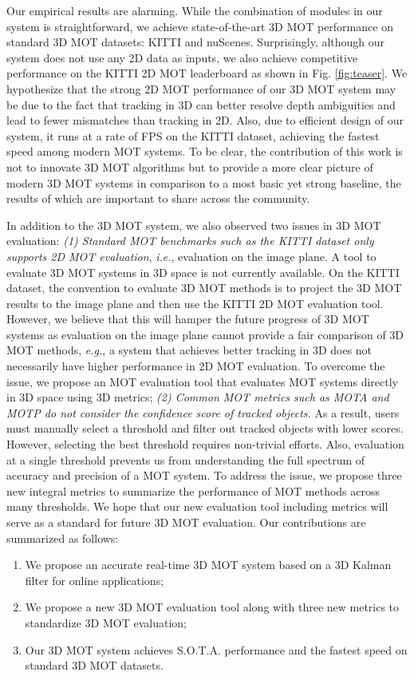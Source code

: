 \documentclass[letterpaper, 10 pt, conference]{ieeeconf}
\begin{document}
Our empirical results are alarming. While the combination of modules in our system is straightforward, we achieve state-of-the-art 3D MOT performance on standard 3D MOT datasets: KITTI and nuScenes. Surprisingly, although our system does not use any 2D data as inputs, we also achieve competitive performance on the KITTI 2D MOT leaderboard as shown in Fig. \ref{fig:teaser}. We hypothesize that the strong 2D MOT performance of our 3D MOT system may be due to the fact that tracking in 3D can better resolve depth ambiguities and lead to fewer mismatches than tracking in 2D. Also, due to efficient design of our system, it runs at a rate of  FPS on the KITTI dataset, achieving the fastest speed among modern MOT systems. To be clear, the contribution of this work is not to innovate 3D MOT algorithms but to provide a more clear picture of modern 3D MOT systems in comparison to a most basic yet strong baseline, the results of which are important to share across the community.

In addition to the 3D MOT system, we also observed two issues in 3D MOT evaluation: \textit{(1) Standard MOT benchmarks such as the KITTI dataset only supports 2D MOT evaluation}, \emph{i.e.}, evaluation on the image plane. A tool to evaluate 3D MOT systems in 3D space is not currently available. On the KITTI dataset, the convention to evaluate 3D MOT methods is to project the 3D MOT results to the image plane and then use the KITTI 2D MOT evaluation tool. However, we believe that this will hamper the future progress of 3D MOT systems as evaluation on the image plane cannot provide a fair comparison of 3D MOT methods, \emph{e.g.}, a system that achieves better tracking in 3D does not necessarily have higher performance in 2D MOT evaluation. To overcome the issue, we propose an MOT evaluation tool that evaluates MOT systems directly in 3D space using 3D metrics; \textit{(2) Common MOT metrics such as MOTA and MOTP do not consider the confidence score of tracked objects.} As a result, users must manually select a threshold and filter out tracked objects with lower scores. However, selecting the best threshold requires non-trivial efforts. Also, evaluation at a single threshold prevents us from understanding the full spectrum of accuracy and precision of a MOT system. To address the issue, we propose three new integral metrics to summarize the performance of MOT methods across many thresholds. We hope that our new evaluation tool including metrics will serve as a standard for future 3D MOT evaluation. Our contributions are summarized as follows: 
\begin{enumerate}
    \item We propose an accurate real-time 3D MOT system based on a 3D Kalman filter for online applications; 
    \item We propose a new 3D MOT evaluation tool along with three new metrics to standardize 3D MOT evaluation;
    \item Our 3D MOT system achieves S.O.T.A. performance and the fastest speed on standard 3D MOT datasets. 
\end{enumerate}
\end{document}
